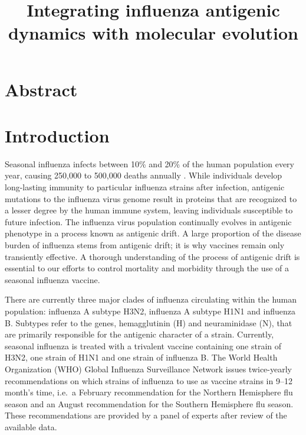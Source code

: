 \documentclass[11pt,oneside,letterpaper]{article}
\title{\vspace{1.0cm} \LARGE \bf Integrating influenza antigenic dynamics with molecular evolution}
\author{}
\date{}
\begin{document}
\maketitle

\section*{Abstract}

\section*{Introduction}

Seasonal influenza infects between 10\% and 20\% of the human population every year, causing 250,000 to 500,000 deaths annually \cite{flufactsheet}. 
While individuals develop long-lasting immunity to particular influenza strains after infection, antigenic mutations to the influenza virus genome result in proteins that are recognized to a lesser degree by the human immune system, leaving individuals susceptible to future infection. 
The influenza virus population continually evolves in antigenic phenotype in a process known as antigenic drift. 
A large proportion of the disease burden of influenza stems from antigenic drift; it is why vaccines remain only transiently effective. 
A thorough understanding of the process of antigenic drift is essential to our efforts to control mortality and morbidity through the use of a seasonal influenza vaccine.

There are currently three major clades of influenza circulating within the human population: influenza A subtype H3N2, influenza A subtype H1N1 and influenza B. 
Subtypes refer to the genes, hemagglutinin (H) and neuraminidase (N), that are primarily responsible for the antigenic character of a strain. 
Currently, seasonal influenza is treated with a trivalent vaccine containing one strain of H3N2, one strain of H1N1 and one strain of influenza B. 
The World Health Organization (WHO) Global Influenza Surveillance Network issues twice-yearly recommendations on which strains of influenza to use as vaccine strains in 9--12 month’s time, i.e.\ a February recommendation for the Northern Hemisphere flu season and an August recommendation for the Southern Hemisphere flu season. 
These recommendations are provided by a panel of experts after review of the available data.
\end{document}
